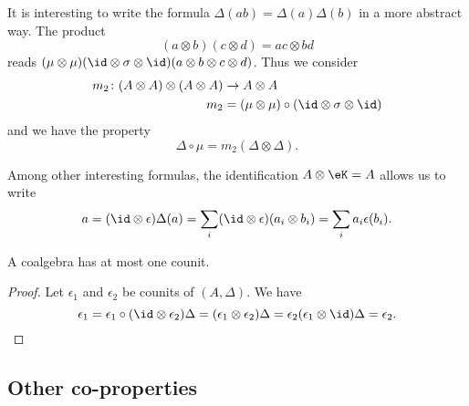 It is interesting to write the formula \( \Delta(ab)=\Delta(a)\Delta(b)\) in a more abstract way. The product 
\begin{equation}
    (a\otimes b)(c\otimes d)=ac\otimes bd
\end{equation}
reads $(\mu\otimes\mu)(\id\otimes\sigma\otimes\id)(a\otimes b\otimes c\otimes d)$. Thus we consider
\begin{equation}        \label{EqDefmdeuxAAotAAmtAA}
    \begin{aligned}
        m_2\colon (A\otimes A)\otimes (A\otimes A)&\to A\otimes A \\
        m_2&=(\mu\otimes\mu)\circ(\id\otimes\sigma\otimes\id)
    \end{aligned}
\end{equation}
and we have the property
\begin{equation}        \label{EqDelMumdex}
    \Delta\circ\mu=m_2(\Delta\otimes\Delta).
\end{equation}


Among other interesting formulas, the identification \( A\otimes \eK=A\) allows us to write
\begin{equation}    \label{EqInterAmongOtheaaepsb}
    a=(\id\otimes\epsilon)\Delta(a)=\sum_i(\id\otimes \epsilon)(a_i\otimes b_i)=\sum_ia_i\epsilon(b_i).
\end{equation}

\begin{lemma}       \label{LemUnicityCounit}
    A coalgebra has at most one counit.
\end{lemma}

\begin{proof}
    Let \( \epsilon_1\) and \( \epsilon_2\) be counits of \( (A,\Delta)\). We have
    \begin{equation}
            \epsilon_1=\epsilon_1\circ(\id\otimes\epsilon_2)\Delta
            =(\epsilon_1\otimes\epsilon_2)\Delta
            =\epsilon_2(\epsilon_1\otimes\id)\Delta
            =\epsilon_2.
    \end{equation}
\end{proof}


\subsection{Other co-properties}
\label{subSecOtherCoPropoerties}

